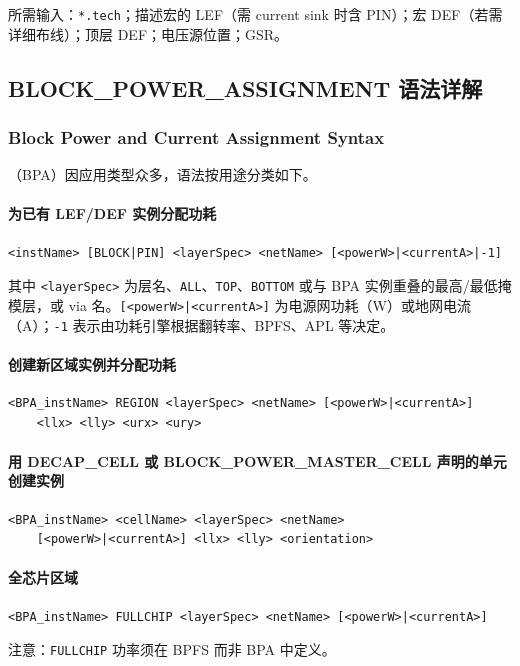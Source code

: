 所需输入：\texttt{*.tech}；描述宏的 LEF（需 current sink 时含 PIN）；宏 DEF（若需详细布线）；顶层 DEF；电压源位置；GSR。


\subsection{BLOCK\_POWER\_ASSIGNMENT 语法详解}
\subsubsection*{Block Power and Current Assignment Syntax}

（BPA）因应用类型众多，语法按用途分类如下。

\paragraph{为已有 LEF/DEF 实例分配功耗}
\begin{lstlisting}
<instName> [BLOCK|PIN] <layerSpec> <netName> [<powerW>|<currentA>|-1]
\end{lstlisting}
其中 \texttt{<layerSpec>} 为层名、\texttt{ALL}、\texttt{TOP}、\texttt{BOTTOM} 或与 BPA 实例重叠的最高/最低掩模层，或 via 名。\texttt{[<powerW>|<currentA>]} 为电源网功耗（W）或地网电流（A）；\texttt{-1} 表示由功耗引擎根据翻转率、BPFS、APL 等决定。

\paragraph{创建新区域实例并分配功耗}
\begin{lstlisting}
<BPA_instName> REGION <layerSpec> <netName> [<powerW>|<currentA>]
    <llx> <lly> <urx> <ury>
\end{lstlisting}

\paragraph{用 DECAP\_CELL 或 BLOCK\_POWER\_MASTER\_CELL 声明的单元创建实例}
\begin{lstlisting}
<BPA_instName> <cellName> <layerSpec> <netName>
    [<powerW>|<currentA>] <llx> <lly> <orientation>
\end{lstlisting}

\paragraph{全芯片区域}
\begin{lstlisting}
<BPA_instName> FULLCHIP <layerSpec> <netName> [<powerW>|<currentA>]
\end{lstlisting}
注意：\texttt{FULLCHIP} 功率须在 BPFS 而非 BPA 中定义。

